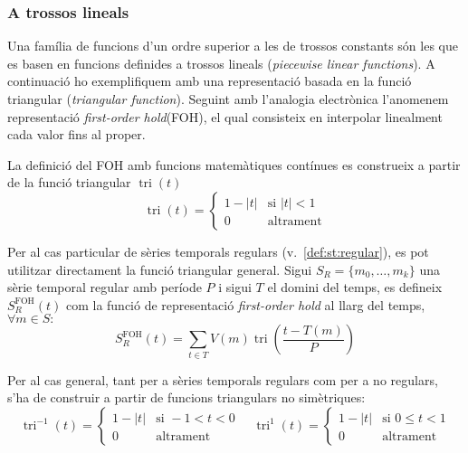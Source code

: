 \subsubsection{A trossos lineals}

Una família de funcions d'un ordre superior a les de trossos constants
són les que es basen en funcions definides a trossos lineals
(\emph{piecewise linear functions}).  A continuació ho exemplifiquem
amb una representació basada en la funció triangular (\emph{triangular
  function}). Seguint amb l'analogia electrònica l'anomenem
representació \emph{first-order hold}(FOH), el qual consisteix en
interpolar linealment cada valor fins al proper.


La definició del FOH amb funcions matemàtiques contínues es construeix
a partir de la funció triangular $\operatorname{tri}(t)$
\[
\operatorname{tri}(t) = 
\begin{cases}
  1-|t| & \text{si } |t| < 1\\
  0 & \text{altrament}
\end{cases}
\]

Per al cas particular de sèries temporals regulars
(v.~\autoref{def:st:regular}), es pot utilitzar directament la funció
triangular general.  Sigui $S_R=\{m_0,\ldots,m_k\}$ una sèrie temporal
regular amb període $P$ i sigui $T$ el domini del temps, es defineix
$S^\text{FOH}_ R(t)$ com la funció de representació \emph{first-order
  hold} al llarg del temps, $\forall m \in S:$
\[
S_ R^\text{FOH}(t) = \sum_{t\in T} V(m)
\operatorname{tri}\left(\frac{t-T(m)}{P}\right)
\]



Per al cas general, tant per a sèries temporals regulars com per a no
regulars, s'ha de construir a partir de funcions triangulars no
simètriques:
\[
\operatorname{tri}^{-1}(t) = 
\begin{cases}
  1-|t| & \text{si } -1 < t < 0\\
  0 & \text{altrament}
\end{cases}
\quad
\operatorname{tri}^1(t) = 
\begin{cases}
  1-|t| & \text{si } 0 \leq t < 1\\
  0 & \text{altrament}
\end{cases}
\]


